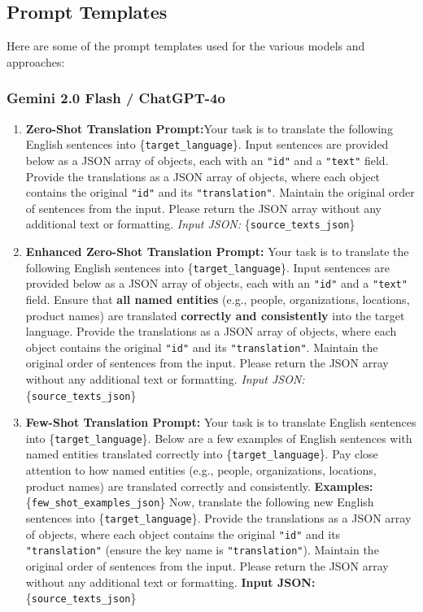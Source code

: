 \documentclass[final]{ecai}
\begin{document}
\subsection{Prompt Templates}

Here are some of the prompt templates used for the various models and approaches:

\subsubsection{Gemini 2.0 Flash / ChatGPT-4o}


\begin{enumerate}
    \item \textbf{Zero-Shot Translation Prompt:}Your task is to translate the following English sentences into \{\texttt{target\_language}\}. Input sentences are provided below as a JSON array of objects, each with an \texttt{"id"} and a \texttt{"text"} field. Provide the translations as a JSON array of objects, where each object contains the original \texttt{"id"} and its \texttt{"translation"}. Maintain the original order of sentences from the input. Please return the JSON array without any additional text or formatting. \textit{Input JSON:} \{\texttt{source\_texts\_json}\}
    \item \textbf{Enhanced Zero-Shot Translation Prompt:} Your task is to translate the following English sentences into \{\texttt{target\_language}\}. Input sentences are provided below as a JSON array of objects, each with an \texttt{"id"} and a \texttt{"text"} field. Ensure that \textbf{all named entities} (e.g., people, organizations, locations, product names) are translated \textbf{correctly and consistently} into the target language. Provide the translations as a JSON array of objects, where each object contains the original \texttt{"id"} and its \texttt{"translation"}. Maintain the original order of sentences from the input. Please return the JSON array without any additional text or formatting. \textit{Input JSON:} \{\texttt{source\_texts\_json}\}
    \item \textbf{Few-Shot Translation Prompt:} Your task is to translate English sentences into \{\texttt{target\_language}\}. Below are a few examples of English sentences with named entities translated correctly into \{\texttt{target\_language}\}. Pay close attention to how named entities (e.g., people, organizations, locations, product names) are translated correctly and consistently. \textbf{Examples:} \{\texttt{few\_shot\_examples\_json}\} Now, translate the following new English sentences into \{\texttt{target\_language}\}. Provide the translations as a JSON array of objects, where each object contains the original \texttt{"id"} and its \texttt{"translation"} (ensure the key name is \texttt{"translation"}). Maintain the original order of sentences from the input. Please return the JSON array without any additional text or formatting. \textbf{Input JSON:} \{\texttt{source\_texts\_json}\}

\end{enumerate}
\end{document}
